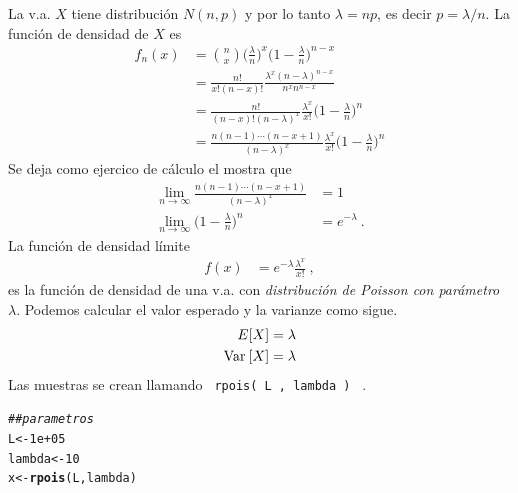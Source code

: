\documentclass[12pt,reqno]{amsart}\usepackage[]{graphicx}\usepackage[]{color}
\makeatletter
\newcommand{\hlnum}[1]{\textcolor[rgb]{0.686,0.059,0.569}{#1}}%
\newcommand{\hlcom}[1]{\textcolor[rgb]{0.678,0.584,0.686}{\textit{#1}}}%
\newcommand{\hlstd}[1]{\textcolor[rgb]{0.345,0.345,0.345}{#1}}%
\newcommand{\hlkwb}[1]{\textcolor[rgb]{0.69,0.353,0.396}{#1}}%
\newcommand{\hlkwd}[1]{\textcolor[rgb]{0.737,0.353,0.396}{\textbf{#1}}}%
\newenvironment{kframe}{%
 \def\at@end@of@kframe{}%
 \ifinner\ifhmode%
  \def\at@end@of@kframe{\end{minipage}}%
  \begin{minipage}{\columnwidth}%
 \fi\fi%
 \def\FrameCommand##1{\hskip\@totalleftmargin \hskip-\fboxsep
 \colorbox{shadecolor}{##1}\hskip-\fboxsep
     \hskip-\linewidth \hskip-\@totalleftmargin \hskip\columnwidth}%
 \MakeFramed {\advance\hsize-\width
   \@totalleftmargin\z@ \linewidth\hsize
   \@setminipage}}%
 {\par\unskip\endMakeFramed%
 \at@end@of@kframe}
\newenvironment{knitrout}{}{} %
\makeatother
\begin{document}
La v.a. $X$ tiene distribución $N(n,p)$ y por lo tanto $\lambda = np$, es decir $p = \lambda/n$. La función de densidad de $X$ es
\begin{equation}
  \begin{split}
    f_{n}(x)&= { n \choose x } \biggl( \frac{\lambda}{n} \biggr)^{x} \biggl( 1-\frac{\lambda}{n} \biggr)^{n-x}\\
        &=\frac{n!}{x!(n-x)!}\frac{\lambda^{x}(n-\lambda)^{n-x}}{n^x n^{n-x}}\\
        &=\frac{n!}{(n-x)!(n-\lambda)^x}\frac{\lambda^{x}}{x!}\biggl( 1-\frac{\lambda}{n}\biggr)^{n}\\
        &=\frac{n(n-1)\cdots (n-x+1)}{(n-\lambda)^x}\frac{\lambda^{x}}{x!}\biggl( 1-\frac{\lambda}{n}\biggr)^{n}
  \end{split}
\end{equation}
Se deja como ejercico de cálculo el mostra que
\begin{equation}
  \begin{split}
    \lim_{n\to\infty}\frac{n(n-1)\cdots (n-x+1)}{(n-\lambda)^x}&=1\\
    \lim_{n\to\infty} \biggl( 1-\frac{\lambda}{n}\biggr)^{n} &= e^{-\lambda}\:.
  \end{split}
\end{equation}
La función de densidad límite
\begin{equation}\label{dpoisson}
  \begin{split}
    f(x) &= e^{-\lambda}\frac{\lambda^{x}}{x!}\:,
  \end{split}
\end{equation}
es la función de densidad de una v.a. con \emph{distribución de Poisson con parámetro $\lambda$}. Podemos calcular el valor esperado y la varianze como sigue.
\begin{equation}
  \begin{split}
    E[X] &= \lambda\\
    \mathrm{Var}\: [X] &= \lambda \\
  \end{split}
\end{equation}
Las muestras se crean llamando \verb+ rpois( L , lambda ) + .
\begin{knitrout}
\color{fgcolor}\begin{kframe}
\begin{alltt}
\hlcom{## parametros}
\hlstd{L} \hlkwb{<-} \hlnum{1e+05}
\hlstd{lambda} \hlkwb{<-} \hlnum{10}
\hlstd{x} \hlkwb{<-} \hlkwd{rpois}\hlstd{(L, lambda)}
\end{alltt}
\end{kframe}
\end{knitrout}
\end{document}
